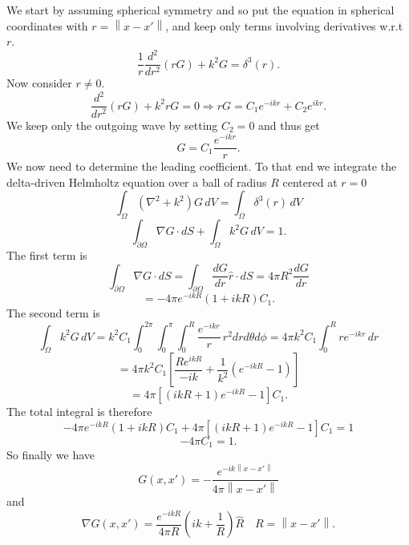 \documentclass{article}
\newcommand{\norm}[1]{\left\lVert #1 \right\rVert}
\theoremstyle{plain}
\begin{document}
We start by assuming spherical symmetry and so put the equation in spherical coordinates with $r=\norm{x-x'}$,
and keep only terms involving derivatives w.r.t $r$.
\begin{equation}
	\frac{1}{r}\frac{d^2}{dr^2}\left( r G \right) + k^2G
	= \delta^3(r).
\end{equation}
Now consider $r\neq 0$.
\begin{equation}
	\frac{d^2}{dr^2}\left( r G \right) + k^2rG
	= 0 \Rightarrow
	rG = C_1e^{-ikr} + C_2e^{ikr}.
\end{equation}
We keep only the outgoing wave by setting $C_2=0$ and thus get
\begin{equation}
	G = C_1 \frac{e^{-ikr}}{r}.
\end{equation}
We now need to determine the leading coefficient.
To that end we integrate the delta-driven Helmholtz equation
over a ball of radius $R$ centered at $r=0$
\begin{equation*}
	\int_\Omega \left( \nabla^2 + k^2 \right)G \,dV
	= \int_\Omega \delta^3(r) \,dV
\end{equation*}
\begin{equation}
	\int_{\partial\Omega} \nabla G\cdot dS
	+ \int_\Omega k^2G \,dV
	= 1.
\end{equation}
The first term is
\begin{equation*}
	\int_{\partial\Omega} \nabla G\cdot dS
	= \int_{\partial\Omega} \frac{dG}{dr} \hat{r}\cdot dS
	= 4\pi R^2 \frac{dG}{dr}
\end{equation*}
\begin{equation}
	= -4\pi e^{-ikR} \left( 1+ikR \right) C_1.
\end{equation}
The second term is
\begin{equation*}
	\int_\Omega k^2G \,dV
	= k^2 C_1 \int_0^{2\pi}\int_0^\pi\int_0^R \frac{e^{-ikr}}{r} \, r^2drd\theta d\phi
	= 4\pi k^2 C_1 \int_0^R re^{-ikr} \, dr
\end{equation*}
\begin{equation*}
	= 4\pi k^2 C_1 \left[ \frac{Re^{ikR}}{-ik} + \frac{1}{k^2}\left(e^{-ikR}-1\right) \right]
\end{equation*}
\begin{equation}
	= 4\pi \left[ \left( ikR+1 \right) e^{-ikR}-1\right] C_1.
\end{equation}
The total integral is therefore
\begin{equation*}
	-4\pi e^{-ikR} \left( 1+ikR \right) C_1
	+ 4\pi \left[ \left( ikR+1 \right) e^{-ikR}-1\right] C_1
	= 1
\end{equation*}
\begin{equation}
	-4\pi C_1 = 1.
\end{equation}
So finally we have
\begin{equation}
	G(x,x') = -\frac{e^{-ik\norm{x-x'}}}{4\pi\norm{x-x'}}
\end{equation}
and
\begin{equation}
	\nabla G(x,x') = \frac{e^{-ikR}}{4\pi R} \left( ik + \frac{1}{R} \right) \hat{R}
	\quad R = \norm{x-x'}.
\end{equation}
\end{document}
